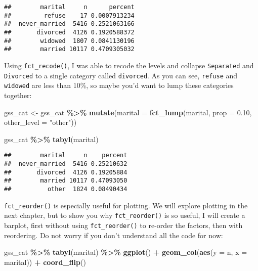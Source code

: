 \documentclass[
]{article}
\newenvironment{Shaded}{\begin{snugshade}}{\end{snugshade}}
\newcommand{\DataTypeTok}[1]{\textcolor[rgb]{0.13,0.29,0.53}{#1}}
\newcommand{\FloatTok}[1]{\textcolor[rgb]{0.00,0.00,0.81}{#1}}
\newcommand{\KeywordTok}[1]{\textcolor[rgb]{0.13,0.29,0.53}{\textbf{#1}}}
\newcommand{\NormalTok}[1]{#1}
\newcommand{\OperatorTok}[1]{\textcolor[rgb]{0.81,0.36,0.00}{\textbf{#1}}}
\newcommand{\StringTok}[1]{\textcolor[rgb]{0.31,0.60,0.02}{#1}}
\begin{document}
\begin{verbatim}
##        marital     n      percent
##         refuse    17 0.0007913234
##  never_married  5416 0.2521063166
##       divorced  4126 0.1920588372
##        widowed  1807 0.0841130196
##        married 10117 0.4709305032
\end{verbatim}

Using \texttt{fct\_recode()}, I was able to recode the levels and collapse \texttt{Separated} and \texttt{Divorced} to
a single category called \texttt{divorced}. As you can see, \texttt{refuse} and \texttt{widowed} are less than 10\%, so
maybe you'd want to lump these categories together:

\begin{Shaded}
\begin{Highlighting}[]
\NormalTok{gss\_cat \textless{}{-}}\StringTok{ }\NormalTok{gss\_cat }\OperatorTok{\%\textgreater{}\%}
\StringTok{  }\KeywordTok{mutate}\NormalTok{(}\DataTypeTok{marital =} \KeywordTok{fct\_lump}\NormalTok{(marital, }\DataTypeTok{prop =} \FloatTok{0.10}\NormalTok{, }\DataTypeTok{other\_level =} \StringTok{"other"}\NormalTok{))}

\NormalTok{gss\_cat }\OperatorTok{\%\textgreater{}\%}
\StringTok{  }\KeywordTok{tabyl}\NormalTok{(marital)}
\end{Highlighting}
\end{Shaded}

\begin{verbatim}
##        marital     n    percent
##  never_married  5416 0.25210632
##       divorced  4126 0.19205884
##        married 10117 0.47093050
##          other  1824 0.08490434
\end{verbatim}

\texttt{fct\_reorder()} is especially useful for plotting. We will explore plotting in the next chapter,
but to show you why \texttt{fct\_reorder()} is so useful, I will create a barplot, first without
using \texttt{fct\_reorder()} to re-order the factors, then with reordering. Do not worry if you don't
understand all the code for now:

\begin{Shaded}
\begin{Highlighting}[]
\NormalTok{gss\_cat }\OperatorTok{\%\textgreater{}\%}
\StringTok{    }\KeywordTok{tabyl}\NormalTok{(marital) }\OperatorTok{\%\textgreater{}\%}
\StringTok{    }\KeywordTok{ggplot}\NormalTok{() }\OperatorTok{+}
\StringTok{    }\KeywordTok{geom\_col}\NormalTok{(}\KeywordTok{aes}\NormalTok{(}\DataTypeTok{y =}\NormalTok{ n, }\DataTypeTok{x =}\NormalTok{ marital)) }\OperatorTok{+}
\StringTok{    }\KeywordTok{coord\_flip}\NormalTok{()}
\end{Highlighting}
\end{Shaded}
\end{document}
